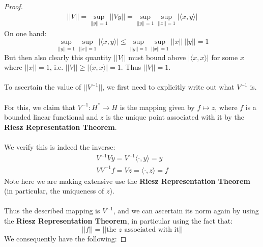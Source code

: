 \documentclass[12pt]{article}
\newenvironment{ex}[2][Exercise]{\begin{trivlist}
\item[\hskip \labelsep {\bfseries #1}\hskip \labelsep {\bfseries #2.}]}{\end{trivlist}}
\begin{document}
\begin{ex}{8}
\begin{enumerate}[label=(\alph*)]
\begin{enumerate}[label=(\roman*)]
\begin{proof}
                \begin{equation}
                    \begin{aligned}
                        ||V|| = \underset{||y|| = 1}{\sup}||Vy||= \underset{||y|| = 1}{\sup} \underset{||x|| = 1}{\sup} |\langle x, y \rangle|
                    \end{aligned}
                \end{equation}
                On one hand: 
                \begin{equation}
                    \underset{||y|| = 1}{\sup} \underset{||x|| = 1}{\sup} |\langle x, y \rangle| \leq  \underset{||y|| = 1}{\sup} \underset{||x|| = 1}{\sup} ||x||\:||y|| = 1
                \end{equation}
                But then also clearly this quantity $||V||$ must bound above $|\langle x, x \rangle|$ for some $x$ where $||x|| = 1$, i.e. $||V|| \geq |\langle x, x \rangle| = 1$. Thus $||V|| = 1$. \\ \\
                To ascertain the value of $||V^{-1}||$, we first need to explicitly write out what $V^{-1}$ is. \\ \\For this, we claim that $V^{-1} : H^* \rightarrow H$ is the mapping given by $f \mapsto z$, where $f$ is a bounded linear functional and $z$ is the unique point associated with it by the \textbf{Riesz Representation Theorem}. \\ \\
                We verify this is indeed the inverse:
                \begin{equation}
                    \begin{aligned}
                        V^{-1}Vy = V^{-1}\langle \cdot, y \rangle = y \\
                        VV^{-1}f = Vz = \langle \cdot, z \rangle = f
                    \end{aligned}
                \end{equation}
                Note here we are making extensive use the \textbf{Riesz Representation Theorem} (in particular, the uniqueness of $z$). \\ \\
                Thus the described mapping is $V^{-1}$, and we can ascertain its norm again by using the \textbf{Riesz Representation Theorem}, in particular using the fact that: $$||f|| = ||\text{the } z \text{ associated with it}||$$
                We consequently have the following:

\end{proof}
\end{enumerate}
\end{enumerate}
\end{ex}
\end{document}
